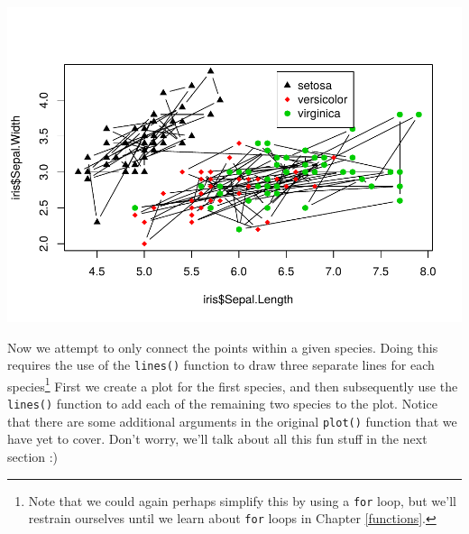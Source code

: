 \documentclass[
]{krantz}
\begin{document}
\includegraphics{bookdown_files/figure-latex/unnamed-chunk-341-1.pdf}

Now we attempt to only connect the points within a given species. Doing this requires the use of the \texttt{lines()} function to draw three separate lines for each species\footnote{Note that we could again perhaps simplify this by using a \texttt{for} loop, but we'll restrain ourselves until we learn about \texttt{for} loops in Chapter \ref{functions}.} First we create a plot for the first species, and then subsequently use the \texttt{lines()} function to add each of the remaining two species to the plot. Notice that there are some additional arguments in the original \texttt{plot()} function that we have yet to cover. Don't worry, we'll talk about all this fun stuff in the next section :)
\end{document}
